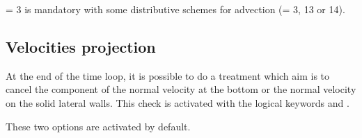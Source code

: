  = 3 is mandatory with some distributive schemes
for advection (= 3, 13 or 14).

\subsection{Velocities projection}

At the end of the time loop, it is possible to do a treatment which aim is to
cancel the component of the normal velocity at the bottom or the normal
velocity on the solid lateral walls. This check is activated with the logical
keywords  and
.

These two options are activated by default.
